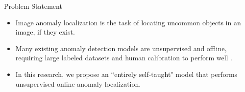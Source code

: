 \documentclass[10pt]{beamer}
\newcommand{\tabimg}[2]{\begin{tabular}{c}\texttt{[image: \#1]}\end{tabular}}
\begin{document}
%
%
%
%
%
%


\begin{frame}{Problem Statement}
\begin{itemize}
\item \alert{Image anomaly localization} is the task of locating uncommon objects in an image, if they exist.

\item Many existing anomaly detection models are unsupervised and offline, requiring large labeled datasets and human calibration to perform well \cite{wta_detection, attention_anomalies}.

\item In this research, we propose an ``entirely self-taught" model that performs \alert{unsupervised online anomaly localization}.\\[4mm]



\end{itemize}
\end{frame}
\end{document}
